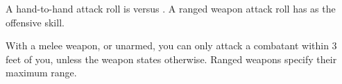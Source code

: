 
A hand-to-hand attack roll is  \orr {} versus  \orr {}. A ranged weapon attack roll has  as the offensive skill.

With a melee weapon, or unarmed, you can only attack a combatant within 3 feet of you, unless the weapon states otherwise. Ranged weapons specify their maximum range.
